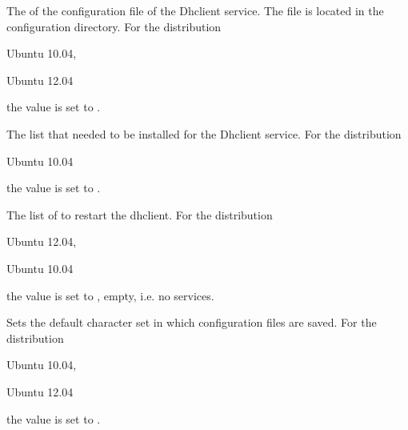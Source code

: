
The  of the configuration file of the Dhclient service. 
The file is located in the configuration directory.
For the distribution
\begin{inparaitem}
\item[\TheDistribution{ubuntu}] Ubuntu 10.04,
\item[\TheDistribution{ubuntu}] Ubuntu 12.04
\end{inparaitem}
the value is set to .


The  list that needed to be installed for the Dhclient service.
For the distribution
\begin{inparaitem}
\item[\TheDistribution{ubuntu}] Ubuntu 10.04
\end{inparaitem}
the value is set to .


The list of  to restart the dhclient.
For the distribution
\begin{inparaitem}
\item[\TheDistribution{ubuntu}] Ubuntu 12.04,
\item[\TheDistribution{ubuntu}] Ubuntu 10.04
\end{inparaitem}
the value is set to \qcode{}, empty, i.e. no services.


Sets the default character set  in which configuration files are 
saved. For the distribution
\begin{inparaitem}
\item[\TheDistribution{ubuntu}] Ubuntu 10.04,
\item[\TheDistribution{ubuntu}] Ubuntu 12.04
\end{inparaitem}
the value is set to .



